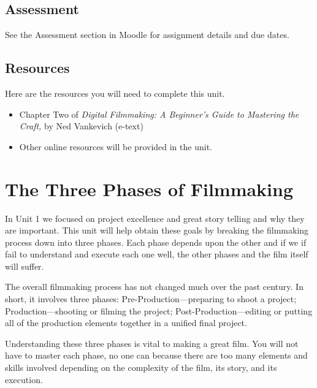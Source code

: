 \documentclass[
]{book}
\providecommand{\tightlist}{%
  \setlength{\itemsep}{0pt}\setlength{\parskip}{0pt}}
\begin{document}
\hypertarget{assessment-2}{%
\subsection*{Assessment}\label{assessment-2}}

See the Assessment section in Moodle for assignment details and due dates.

\hypertarget{resources-1}{%
\subsection*{Resources}\label{resources-1}}

Here are the resources you will need to complete this unit.

\begin{itemize}
\tightlist
\item
  Chapter Two of \emph{Digital Filmmaking: A Beginner's Guide to Mastering the Craft,} by Ned Vankevich (e-text)
\item
  Other online resources will be provided in the unit.
\end{itemize}

\hypertarget{the-three-phases-of-filmmaking}{%
\section{The Three Phases of Filmmaking}\label{the-three-phases-of-filmmaking}}

In Unit 1 we focused on project excellence and great story telling and why they are important. This unit will help obtain these goals by breaking the filmmaking process down into three phases. Each phase depends upon the other and if we if fail to understand and execute each one well, the other phases and the film itself will suffer.

The overall filmmaking process has not changed much over the past century. In short, it involves three phases: Pre-Production---preparing to shoot a project; Production---shooting or filming the project; Post-Production---editing or putting all of the production elements together in a unified final project.

Understanding these three phases is vital to making a great film. You will not have to master each phase, no one can because there are too many elements and skills involved depending on the complexity of the film, its story, and its execution.
\end{document}
